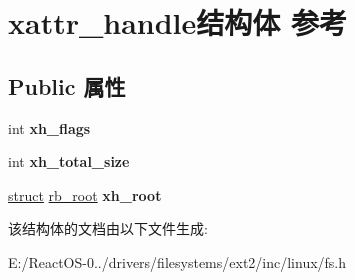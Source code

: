\hypertarget{structxattr__handle}{}\section{xattr\+\_\+handle结构体 参考}
\label{structxattr__handle}
\subsection*{Public 属性}
\begin{DoxyCompactItemize}
\item 
\mbox{\label{structxattr__handle_a57ce8e00e00dadec858345ec84cb3c03}} 
int {\bfseries xh\+\_\+flags}
\item 
\mbox{\label{structxattr__handle_aa59240d354c7a2e0edbc0505f87043a0}} 
int {\bfseries xh\+\_\+total\+\_\+size}
\item 
\mbox{\label{structxattr__handle_a28d4c85412d593f23ecd5c3f6296a5dc}} 
\hyperlink{interfacestruct}{struct} \hyperlink{structrb__root}{rb\+\_\+root} {\bfseries xh\+\_\+root}
\end{DoxyCompactItemize}


该结构体的文档由以下文件生成\+:\begin{DoxyCompactItemize}
\item 
E\+:/\+React\+O\+S-\/0../drivers/filesystems/ext2/inc/linux/fs.\+h\end{DoxyCompactItemize}
